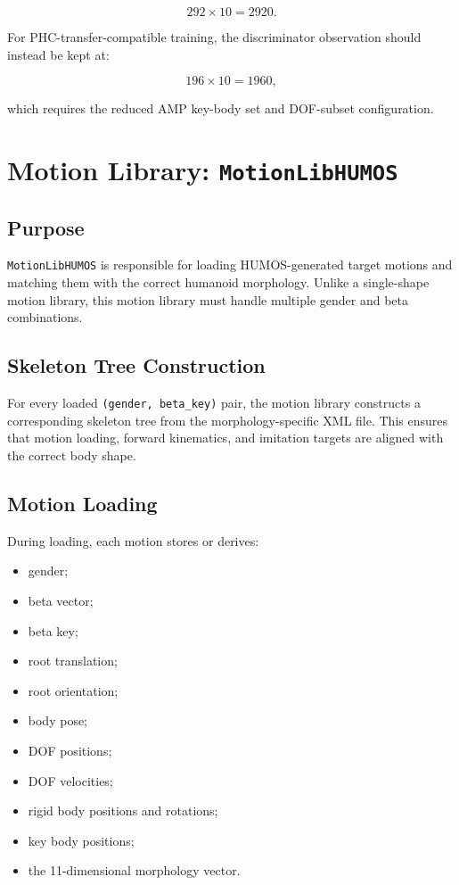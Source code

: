 \documentclass[11pt,a4paper]{article}
\begin{document}
\begin{equation}
    292 \times 10 = 2920.
\end{equation}

For PHC-transfer-compatible training, the discriminator observation should instead be kept at:

\begin{equation}
    196 \times 10 = 1960,
\end{equation}

which requires the reduced AMP key-body set and DOF-subset configuration.

\section{Motion Library: \texttt{MotionLibHUMOS}}

\subsection{Purpose}

\texttt{MotionLibHUMOS} is responsible for loading HUMOS-generated target motions and matching them with the correct humanoid morphology. Unlike a single-shape motion library, this motion library must handle multiple gender and beta combinations.

\subsection{Skeleton Tree Construction}

For every loaded \texttt{(gender, beta\_key)} pair, the motion library constructs a corresponding skeleton tree from the morphology-specific XML file. This ensures that motion loading, forward kinematics, and imitation targets are aligned with the correct body shape.

\subsection{Motion Loading}

During loading, each motion stores or derives:

\begin{itemize}[leftmargin=2em]
    \item gender;
    \item beta vector;
    \item beta key;
    \item root translation;
    \item root orientation;
    \item body pose;
    \item DOF positions;
    \item DOF velocities;
    \item rigid body positions and rotations;
    \item key body positions;
    \item the 11-dimensional morphology vector.
\end{itemize}
\end{document}
